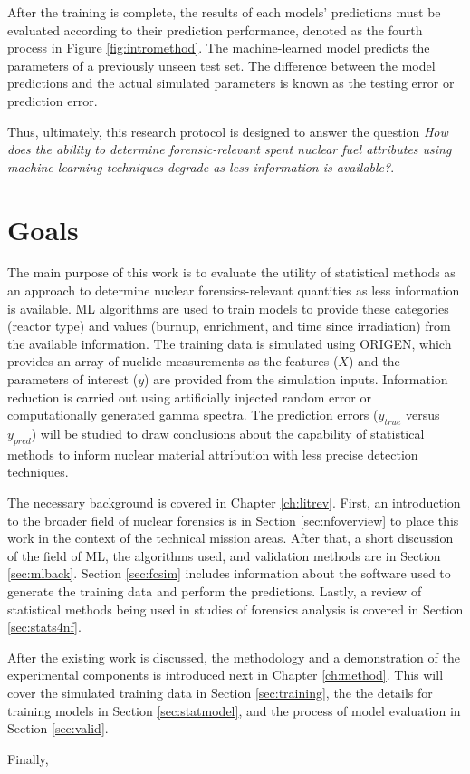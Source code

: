 After the training is complete, the results of each models' predictions must be
evaluated according to their prediction performance, denoted as the fourth
process in Figure \ref{fig:intromethod}.  The machine-learned model predicts
the parameters of a previously unseen test set.  The difference between the
model predictions and the actual simulated parameters is known as the testing
error or prediction error.  

Thus, ultimately, this research protocol is designed to answer the question
\textit{How does the ability to determine forensic-relevant spent nuclear fuel
attributes using machine-learning techniques degrade as less information is
available?}. 

\section{Goals}

The main purpose of this work is to evaluate the utility of statistical methods
as an approach to determine nuclear forensics-relevant quantities as less
information is available. \Gls{ML} algorithms are used to train models to
provide these categories (reactor type) and values (burnup, enrichment, and
time since irradiation) from the available information.  The training data is
simulated using \gls{ORIGEN}, which provides an array of nuclide measurements
as the features ($X$) and the parameters of interest ($y$) are provided from
the simulation inputs. Information reduction is carried out using artificially
injected random error or computationally generated gamma spectra. The
prediction errors ($y_{true}$ versus $y_{pred}$) will be studied to draw
conclusions about the capability of statistical methods to inform nuclear
material attribution with less precise detection techniques.


The necessary background is covered in Chapter \ref{ch:litrev}.  First, an
introduction to the broader field of nuclear forensics is in Section
\ref{sec:nfoverview} to place this work in the context of the technical mission
areas. After that, a short discussion of the field of \gls{ML}, the algorithms
used, and validation methods are in Section \ref{sec:mlback}.  Section
\ref{sec:fcsim} includes information about the software used to generate the
training data and perform the predictions.  Lastly, a review of statistical
methods being used in studies of forensics analysis is covered in Section
\ref{sec:stats4nf}. 

After the existing work is discussed, the methodology and a demonstration of
the experimental components is introduced next in Chapter \ref{ch:method}.
This will cover the simulated training data in Section \ref{sec:training}, the
the details for training models in Section \ref{sec:statmodel}, and the process
of model evaluation in Section \ref{sec:valid}.  

Finally, 
